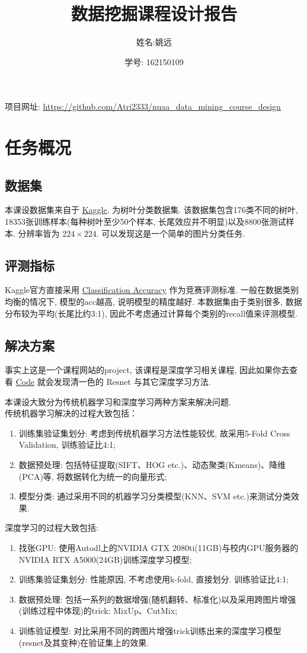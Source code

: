 \documentclass[lang=cn,12pt,a4paper]{elegantpaper}
\title{数据挖掘课程设计报告}
\author{姓名:姚远\and 学号: 162150109}
\date{\zhtoday}
\begin{document}
\maketitle
项目网址: \href{https://github.com/Atri2333/nuaa_data_mining_course_design}{\color{black}https://github.com/Atri2333/nuaa\_data\_mining\_course\_design}
\section{任务概况}
\subsection{数据集}
本课设数据集来自于 \href{https://www.kaggle.com/competitions/classify-leaves}{Kaggle}, 为树叶分类数据集. 该数据集包含176类不同的树叶, 18353张训练样本(每种树叶至少50个样本, 长尾效应并不明显)以及8800张测试样本. 分辨率皆为 $224 \times 224$. 可以发现这是一个简单的图片分类任务.
\subsection{评测指标}
Kaggle官方直接采用 \href{https://www.kaggle.com/vipulgandhi/how-to-choose-right-metric-for-evaluating-ml-model}{Classification Accuracy} 作为竞赛评测标准. 一般在数据类别均衡的情况下, 模型的acc越高, 说明模型的精度越好. 本数据集由于类别很多, 数据分布较为平均(长尾比约3:1), 因此不考虑通过计算每个类别的recall值来评测模型.
\subsection{解决方案}
事实上这是一个课程网站的project, 该课程是深度学习相关课程, 因此如果你去查看 \href{https://www.kaggle.com/competitions/classify-leaves/code}{Code} 就会发现清一色的 Resnet 与其它深度学习方法.

本课设大致分为传统机器学习和深度学习两种方案来解决问题. \\传统机器学习解决的过程大致包括：
\begin{enumerate}
    \item 训练集验证集划分: 考虑到传统机器学习方法性能较优, 故采用5-Fold Cross Validation, 训练验证比4:1;
    \item 数据预处理: 包括特征提取(SIFT、HOG etc.)、动态聚类(Kmeans)、降维(PCA)等, 将数据转化为统一的向量形式;
    \item 模型分类: 通过采用不同的机器学习分类模型(KNN、SVM etc.)来测试分类效果.
\end{enumerate}
深度学习的过程大致包括:
\begin{enumerate}
    \item 找张GPU: 使用Autodl上的NVIDIA GTX 2080ti(11GB)与校内GPU服务器的NVIDIA RTX A5000(24GB)训练深度学习模型;
    \item 训练集验证集划分: 性能原因, 不考虑使用k-fold, 直接划分. 训练验证比4:1;
    \item 数据预处理: 包括一系列的数据增强(随机翻转、标准化)以及采用跨图片增强(训练过程中体现)的trick: MixUp、CutMix;
    \item 训练验证模型: 对比采用不同的跨图片增强trick训练出来的深度学习模型(resnet及其变种)在验证集上的效果.
\end{enumerate}
\end{document}
